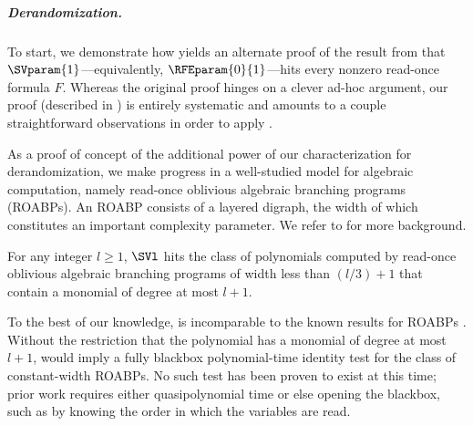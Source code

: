 \documentclass{toc}
\begin{document}
\subparagraph{Derandomization.}
To start,
we demonstrate how  yields an alternate
proof of the result from \cite{MinahanVolkovich2017}
that \(\SVparam{1}\)---equivalently, \(\RFEparam{0}{1}\)---hits
every nonzero read-once formula $F$.
Whereas the original proof hinges on a clever ad-hoc argument,
our proof (described in  ) is entirely systematic and amounts to
a couple straightforward observations in order to apply
.

As a proof of concept of the additional power of our characterization for derandomization,
we make progress in a well-studied model for algebraic computation, namely read-once oblivious algebraic
branching programs (ROABPs). An ROABP consists of a layered digraph, the width of which constitutes an important complexity parameter. We refer to  for more background.

\begin{theorem}\label{thm.roabp}
  For any integer $l \ge 1$, $\SVl$ hits the class of polynomials computed by
  read-once oblivious algebraic branching programs of width less than
  $(l/3)+1$ that contain a monomial of degree at most $l+1$.
\end{theorem}
To the best of our knowledge,
 is incomparable to the known results for ROABPs
\cite{RazShpilka2005,JQS2009,JQS2010,ForbesShpilka2013,FSS2014,AGKS2014,AFSSV2015,GKST2015,GKS2016,GuoGurjar2020,SahaThankey2021,BhargavaGhosh2021}.
Without the restriction that the polynomial has a monomial of degree at most
\(l+1\),
 would imply a fully blackbox polynomial-time identity test
for the class of constant-width ROABPs.
No such test has been proven to exist at this time;
prior work requires either quasipolynomial time or else opening the
blackbox,
such as by knowing the order in which the variables are read.
\end{document}
